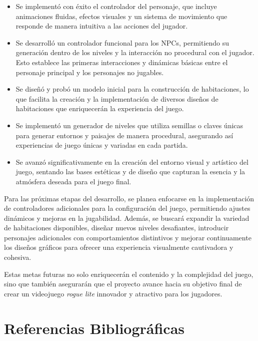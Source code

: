 \documentclass[12pt,twoside]{article}
\begin{document}
	\begin{itemize}
		\item Se implementó con éxito el controlador del personaje, que incluye animaciones fluidas, efectos visuales y un sistema de movimiento que responde de manera intuitiva a las acciones del jugador.
		\item Se desarrolló un controlador funcional para los NPCs, permitiendo su generación dentro de los niveles y la interacción no procedural con el jugador. Esto establece las primeras interacciones y dinámicas básicas entre el personaje principal y los personajes no jugables.
		\item Se diseñó y probó un modelo inicial para la construcción de habitaciones, lo que facilita la creación y la implementación de diversos diseños de habitaciones que enriquecerán la experiencia del juego.
		\item Se implementó un generador de niveles que utiliza semillas o claves únicas para generar entornos y paisajes de manera procedural, asegurando así experiencias de juego únicas y variadas en cada partida.
		\item Se avanzó significativamente en la creación del entorno visual y artístico del juego, sentando las bases estéticas y de diseño que capturan la esencia y la atmósfera deseada para el juego final.
	\end{itemize}
	
	Para las próximas etapas del desarrollo, se planea enfocarse en la implementación de controladores adicionales para la configuración del juego, permitiendo ajustes dinámicos y mejoras en la jugabilidad. Además, se buscará expandir la variedad de habitaciones disponibles, diseñar nuevos niveles desafiantes, introducir personajes adicionales con comportamientos distintivos y mejorar continuamente los diseños gráficos para ofrecer una experiencia visualmente cautivadora y cohesiva.
	
	Estas metas futuras no solo enriquecerán el contenido y la complejidad del juego, sino que también asegurarán que el proyecto avance hacia su objetivo final de crear un videojuego \textit{rogue lite} innovador y atractivo para los jugadores.

	
	\clearpage
	
	\section{Referencias Bibliográficas}
	
\end{document}
